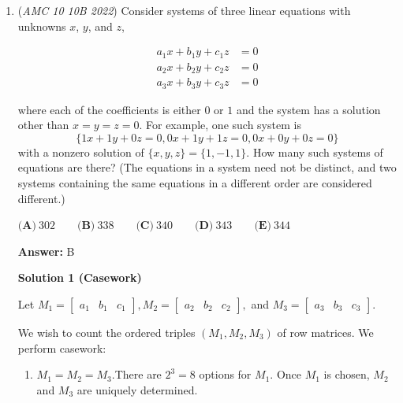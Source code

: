 \begin{enumerate}
\textbf{Solution 6 (Extremely Illegal Cheese)}

All of the other solutions are extremely long, but this is how to cheese it using some methods that MIGHT be unreliable:First, turn 606 to 0 and 607 to 1. Next, Calculate each value, giving you $A=0 B=2 C=1 D=3 E=5$. Now since 2, 3, and 5 are prime, they can be divided by a prime(themselves). 0 doesn't really have multiples, so you can literally ignore it, and since 1 is only divisible by 1, which isnt prime, you get the correct answer, $\boxed{(\text{C})}$.

 


	\item (\textit{AMC 10 10B 2022}) Consider systems of three linear equations with unknowns $x$, $y$, and $z$,

 \begin{align*} a_1 x + b_1 y + c_1 z & = 0 \\ a_2 x + b_2 y + c_2 z & = 0 \\ a_3 x + b_3 y + c_3 z & = 0 \end{align*}

where each of the coefficients is either $0$ or $1$ and the system has a solution other than $x=y=z=0$.
For example, one such system is 
 \[\{ 1x + 1y + 0z = 0, 0x + 1y + 1z = 0, 0x + 0y + 0z = 0 \}\]
with a nonzero solution of $\{x,y,z\} = \{1, -1, 1\}$. How many such systems of equations are there?
(The equations in a system need not be distinct, and two systems containing the same equations in a
different order are considered different.)


 $\textbf{(A)}\ 302 \qquad\textbf{(B)}\ 338 \qquad\textbf{(C)}\ 340 \qquad\textbf{(D)}\ 343 \qquad\textbf{(E)}\ 344$

 \textbf{Answer: }B



\textbf{Solution 1 (Casework)}

Let $M_1=\begin{bmatrix}a_1 & b_1 & c_1\end{bmatrix}, M_2=\begin{bmatrix}a_2 & b_2 & c_2\end{bmatrix},$ and $M_3=\begin{bmatrix}a_3 & b_3 & c_3\end{bmatrix}.$ 

 We wish to count the ordered triples $(M_1,M_2,M_3)$ of row matrices. We perform casework:

 
            \begin{enumerate} 
        \item $M_1=M_2=M_3.$There are $2^3=8$ options for $M_1.$ Once $M_1$ is chosen, $M_2$ and $M_3$ are uniquely determined. 


\end{enumerate}
\end{enumerate}
